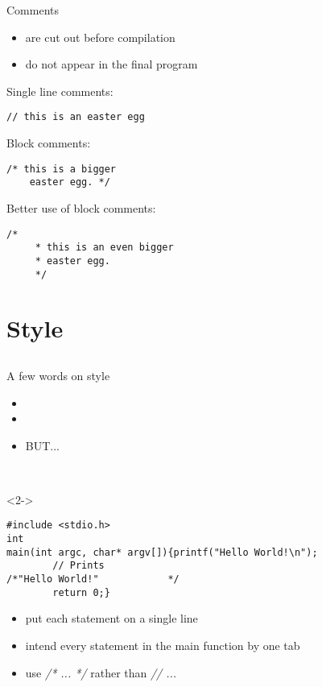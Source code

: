 \begin{frame}[fragile]{Comments}
	\begin{itemize}
		\item are cut out before compilation
		\item do not appear in the final program
	\end{itemize}
	Single line comments:
	\begin{lstlisting}[numbers=none]
	// this is an easter egg
\end{lstlisting}
	Block comments:
	\begin{lstlisting}[numbers=none]
	/* this is a bigger
	easter egg. */
\end{lstlisting}
	Better use of block comments:
	\begin{lstlisting}[numbers=none]
	/*
	 * this is an even bigger
	 * easter egg.
	 */
\end{lstlisting}
\end{frame}
\section{Style}
\subsection{}
\begin{frame}[fragile]{A few words on style}
	\begin{itemize}
		\item
		\item
		\item<2-> BUT...
	\end{itemize}
	\ \\
	\begin{uncoverenv}<2->
	\begin{lstlisting}[numbers=none]
#include <stdio.h>
int
main(int argc, char* argv[]){printf("Hello World!\n");
		// Prints
/*"Hello World!"			*/
		return 0;}
\end{lstlisting}
	\end{uncoverenv}
	\begin{itemize}
		\item<3-> put each statement on a single line
		\item<3-> intend every statement in the main function by one tab
		\item<3-> use \textit{/* ... */} rather than \textit{// ...}
	\end{itemize}
\end{frame}


